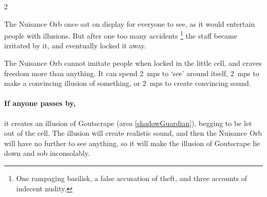 \begin{multicols}{2}


\begin{exampletext}
  The Nuisance Orb once sat on display for everyone to see, as it would entertain people with illusions.
  But after one too many accidents%
  \footnote{One rampaging \gls{basilisk}, a false accusation of theft, and three accounts of indecent nudity.}
  the staff became irritated by it, and eventually locked it away.
\end{exampletext}

The Nuisance Orb cannot imitate people when locked in the little cell, and craves freedom more than anything.
It can spend 2~\glspl{mp} to `see' around itself, 2~\glspl{mp} to make a convincing illusion of something, or 2~\glspl{mp} to create convincing sound.

\paragraph{If anyone passes by,}
it creates an illusion of Goutscrape (area \vref{shadowGuardian}), begging to be let out of the cell.
The illusion will create realistic sound, and then the Nuisance Orb will have no further  to see anything, so it will make the illusion of Goutscrape lie down and sob inconsolably.


\end{multicols}
